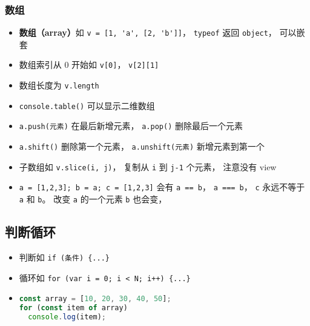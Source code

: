 \subsubsection{数组}
\begin{itemize}
\item \textbf{数组（array）}如 \verb|v = [1, 'a', [2, 'b']]|， \verb|typeof| 返回 \verb|object|， 可以嵌套
\item 数组索引从 0 开始如 \verb|v[0]|， \verb|v[2][1]|
\item 数组长度为 \verb|v.length|
\item \verb|console.table()| 可以显示二维数组
\item \verb|a.push(元素)| 在最后新增元素， \verb|a.pop()| 删除最后一个元素
\item \verb|a.shift()| 删除第一个元素， \verb|a.unshift(元素)| 新增元素到第一个
\item 子数组如 \verb|v.slice(i, j)|， 复制从 \verb|i| 到 \verb|j-1| 个元素， 注意没有 view
\item \verb|a = [1,2,3]; b = a; c = [1,2,3]| 会有 \verb|a == b|， \verb|a === b|， \verb|c| 永远不等于 \verb|a| 和 \verb|b|。 改变 \verb|a| 的一个元素 \verb|b| 也会变， 
\end{itemize}

\subsection{判断循环}
\begin{itemize}
\item 判断如 \verb|if (条件) {...}|
\item 循环如 \verb|for (var i = 0; i < N; i++) {...}|
\item 
\begin{lstlisting}[language=js]
const array = [10, 20, 30, 40, 50];
for (const item of array)
  console.log(item);
\end{lstlisting}
\end{itemize}

